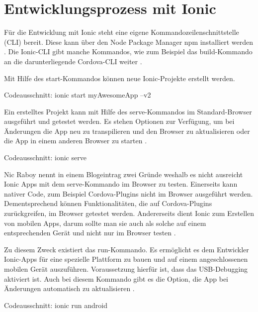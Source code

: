 \chapter{Entwicklungsprozess mit Ionic}
\label{Entwicklungsprozess}

Für die Entwicklung mit Ionic steht eine eigene Kommandozeilenschnittstelle (CLI) bereit. Diese kann über den Node Package Manager npm installiert werden \cite{ionic:cli}. Die Ionic-CLI gibt manche Kommandos, wie zum Beispiel das build-Kommando an die darunterliegende Cordova-CLI weiter \cite{ionic:build}.

Mit Hilfe des start-Kommandos können neue Ionic-Projekte erstellt werden.

Codeausschnitt: ionic start myAwesomeApp --v2 \cite{ionic:cli}

Ein erstelltes Projekt kann mit Hilfe des serve-Kommandos im Standard-Browser ausgeführt und getestet werden. Es stehen Optionen zur Verfügung, um bei Änderungen die App neu zu transpilieren und den Browser zu aktualisieren oder die App in einem anderen Browser zu starten \cite{ionic:serve}.

Codeausschnitt: ionic serve \cite{ionic:cli}

Nic Raboy nennt in einem Blogeintrag zwei Gründe weshalb es nicht ausreicht Ionic Apps mit dem serve-Kommando im Browser zu testen. Einerseits kann nativer Code, zum Beispiel Cordova-Plugins nicht im Browser ausgeführt werden. Dementsprechend können Funktionalitäten, die auf Cordova-Plugins zurückgreifen, im Browser getestet werden. Andererseits dient Ionic zum Erstellen von mobilen Apps, darum sollte man sie auch als solche auf einem entsprechenden Gerät und nicht nur im Browser testen \cite{raboy:serve}.

Zu diesem Zweck existiert das run-Kommando. Es ermöglicht es dem Entwickler Ionic-Apps für eine spezielle Plattform zu bauen und auf einem angeschlossenen mobilen Gerät auszuführen. Voraussetzung hierfür ist, dass das USB-Debugging aktiviert ist. Auch bei diesem Kommando gibt es die Option, die App bei Änderungen automatisch zu aktualisieren \cite{ionic:run}.

Codeausschnitt: ionic run android